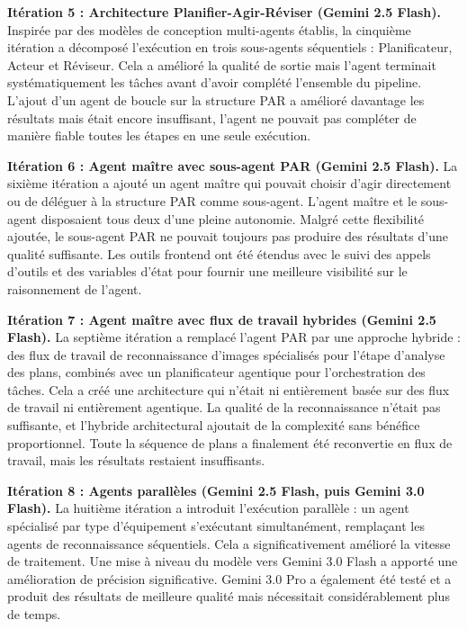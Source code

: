 \textbf{Itération 5 : Architecture Planifier-Agir-Réviser (Gemini 2.5 Flash).}
Inspirée par des modèles de conception multi-agents établis, la cinquième itération a décomposé
l'exécution en trois sous-agents séquentiels : Planificateur, Acteur et Réviseur. Cela a amélioré
la qualité de sortie mais l'agent terminait systématiquement les tâches avant d'avoir complété l'ensemble
du pipeline. L'ajout d'un agent de boucle sur la structure PAR a amélioré davantage les résultats mais
était encore insuffisant, l'agent ne pouvait pas compléter de manière fiable toutes les étapes en une
seule exécution.

\textbf{Itération 6 : Agent maître avec sous-agent PAR (Gemini 2.5 Flash).}
La sixième itération a ajouté un agent maître qui pouvait choisir d'agir directement ou de déléguer à
la structure PAR comme sous-agent. L'agent maître et le sous-agent disposaient tous deux d'une pleine
autonomie. Malgré cette flexibilité ajoutée, le sous-agent PAR ne pouvait toujours pas produire des
résultats d'une qualité suffisante. Les outils frontend ont été étendus avec le suivi des appels d'outils
et des variables d'état pour fournir une meilleure visibilité sur le raisonnement de l'agent.

\textbf{Itération 7 : Agent maître avec flux de travail hybrides (Gemini 2.5 Flash).}
La septième itération a remplacé l'agent PAR par une approche hybride : des flux de travail de
reconnaissance d'images spécialisés pour l'étape d'analyse des plans, combinés avec un planificateur
agentique pour l'orchestration des tâches. Cela a créé une architecture qui n'était ni entièrement basée
sur des flux de travail ni entièrement agentique. La qualité de la reconnaissance n'était pas suffisante,
et l'hybride architectural ajoutait de la complexité sans bénéfice proportionnel. Toute la séquence de
plans a finalement été reconvertie en flux de travail, mais les résultats restaient insuffisants.

\textbf{Itération 8 : Agents parallèles (Gemini 2.5 Flash, puis Gemini 3.0 Flash).}
La huitième itération a introduit l'exécution parallèle : un agent spécialisé par type d'équipement
s'exécutant simultanément, remplaçant les agents de reconnaissance séquentiels. Cela a significativement
amélioré la vitesse de traitement. Une mise à niveau du modèle vers Gemini 3.0 Flash a apporté une
amélioration de précision significative. Gemini 3.0 Pro a également été testé et a produit des résultats
de meilleure qualité mais nécessitait considérablement plus de temps.

